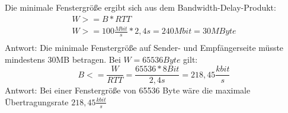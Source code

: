 

Die minimale Fenstergröße ergibt sich aus dem Bandwidth-Delay-Produkt:
\begin{gather*}
    W >= B * RTT\\
    W >= 100 \frac{Mbit}{s} * 2,4s = 240 Mbit = 30MByte\\
\end{gather*}
Antwort: Die minimale Fenstergröße auf Sender- und Empfängerseite müsste mindestens 30MB betragen.
Bei $W = 65536 Byte$ gilt:
\[B <= \frac{W}{RTT} = \frac{65536 * 8 Bit}{2,4s} = 218,45 \frac{kbit}{s}\]
Antwort: Bei einer Fenstergröße von 65536 Byte wäre die maximale Übertragungsrate $218,45 \frac{kbit}{s}$